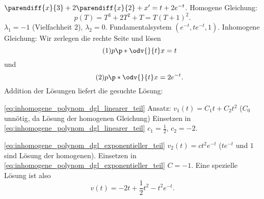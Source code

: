 \begin{beispiel*}
  \( \parendiff{x}{3}+2\parendiff{x}{2}+x'=t+2e^{-t}\). Homogene Gleichung: 
  \begin{equation*}
    p(T)=T^3+2T^2+T=T(T+1)^2.
  \end{equation*}
  \timplies \( \lambda_1=-1 \) (Vielfachheit \( 2 \)), \( \lambda_2=0 \). \timplies Fundamentalsystem \( (e^{-t},te^{-t},1) \). Inhomogene Gleichung: Wir zerlegen die rechte Seite und lösen
  \begin{equation*}
    \tag{1}\label{eq:inhomogene_polynom_dgl_linearer_teil}p\p*{\odv{}{t}}x=t
  \end{equation*}
  und
  \begin{equation*}
    \tag{2}\label{eq:inhomogene_polynom_dgl_exponentieller_teil}p\p*{\odv{}{t}}x=2e^{-t}.
  \end{equation*}
  Addition der Lösungen liefert die gesuchte Lösung:
  \begin{proofdescription}
    \item[\eqref{eq:inhomogene_polynom_dgl_linearer_teil}] Ansatz: \( v_1(t)=C_1 t+C_2 t^2 \) (\( C_0 \) unnötig, da Lösung der homogenen Gleichung) Einsetzen in \eqref{eq:inhomogene_polynom_dgl_linearer_teil} \timplies \( c_1=\frac{1}{2} \), \( c_2=-2 \).
    \item[\eqref{eq:inhomogene_polynom_dgl_exponentieller_teil}] \( v_2(t)=ct^2 e^{-t} \) (\( te^{-t} \) und \( 1 \) sind Lösung der homogenen). Einsetzen in \eqref{eq:inhomogene_polynom_dgl_exponentieller_teil} \timplies \( C=-1 \). Eine spezielle Lösung ist also 
    \begin{equation*}
      v(t)=-2t+\frac{1}{2}t^2-t^2e^{-t}.
    \end{equation*}
  \end{proofdescription}
\end{beispiel*}